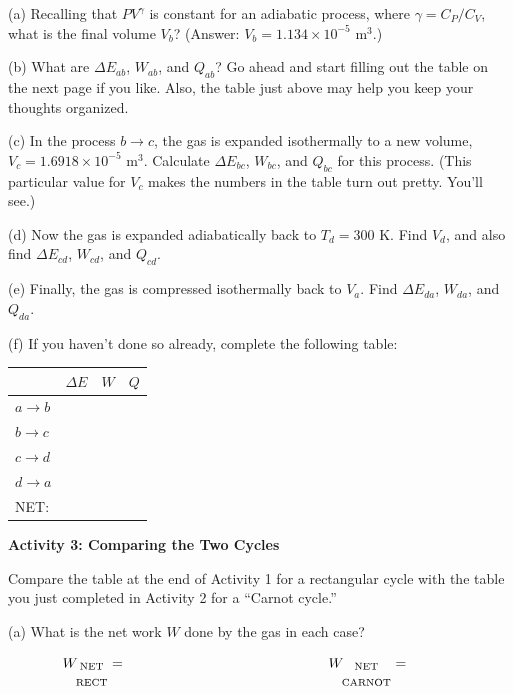 (a) Recalling that $PV^\gamma$ is constant for an adiabatic process, where $\gamma = C_P / C_V$, what is the final volume $V_b$?  (Answer: $V_b=1.134 \times 10^{-5}$ m$^3$.)  
\answerspace{1.8in}

(b) What are $\Delta E_{ab}$, $W_{ab}$, and $Q_{ab}$?  Go ahead and start filling out the table on the next page if you like.  Also, the table just above may help you keep your thoughts organized.
\answerspace{1.8in}

\pagebreak
(c) In the process $b \rightarrow c$, the gas is expanded isothermally to a new volume, $V_c=1.6918 \times 10^{-5}$ m$^3$.  Calculate $\Delta E_{bc}$, $W_{bc}$, and $Q_{bc}$ for this process.  (This particular value for $V_c$ makes the numbers in the table turn out pretty.  You'll see.)
\answerspace{1.6in}

(d) Now the gas is expanded adiabatically back to $T_d=300$ K.  Find $V_d$, and also find  $\Delta E_{cd}$, $W_{cd}$, and $Q_{cd}$.
\answerspace{2.0in}


(e) Finally, the gas is compressed isothermally back to $V_a$.  Find $\Delta E_{da}$, $W_{da}$, and $Q_{da}$.  
\answerspace{1.6in}



(f) If you haven't done so already, complete the following table:
\vspace{0.1 in}

\renewcommand{\arraystretch}{2.0}
\begin{tabular}{| C{1in} |C{1in} | C{1in} | C{1in} |}
\hline
& $\Delta E$ & $W$ & $Q$ \\ \hline
$a \rightarrow b$ & & & \\ \hline
$b \rightarrow c$ & & & \\ \hline
$c \rightarrow d$ & & & \\ \hline
$d \rightarrow a$ & & & \\ \hline
\hline
NET: & & & \\ \hline
\end{tabular}
\renewcommand{\arraystretch}{1.0}

\pagebreak
\textbf{Activity 3: Comparing the Two Cycles}

Compare the table at the end of Activity 1 for a rectangular cycle with the table you just completed in Activity 2 for a ``Carnot cycle.'' 

(a)  What is the net work $W$ done by the gas in each case?

\begin{displaymath}
\hspace{-0.5in} W_{\substack{\textrm{NET} \\ \\ \textrm{RECT}}} =
\hspace{2in} W_{\substack{\textrm{NET} \\ \\ \textrm{CARNOT}}} =
\end{displaymath}


